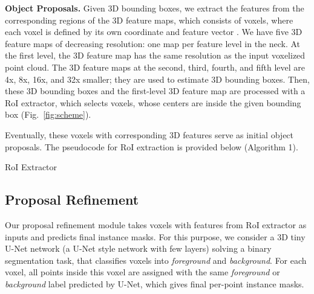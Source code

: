 \documentclass[10pt,twocolumn,letterpaper]{article}
\newcommand\inline{\noindent\textbf}
\begin{document}
\inline{Object Proposals.}
Given 3D bounding boxes, we extract the features from the corresponding regions of the 3D feature maps, which consists of voxels, where each voxel is defined by its own coordinate  and feature vector . We have five 3D feature maps of decreasing resolution: one map per feature level in the neck. At the first level, the 3D feature map has the same resolution as the input voxelized point cloud. The 3D feature maps at the second, third, fourth, and fifth level are 4x, 8x, 16x, and 32x smaller; they are used to estimate 3D bounding boxes. Then, these 3D bounding boxes and the first-level 3D feature map are processed with a RoI extractor, which selects voxels, whose centers are inside the given bounding box (Fig.~\ref{fig:scheme}). 

Eventually, these voxels with corresponding 3D features serve as initial object proposals. The pseudocode for RoI extraction is provided below (Algorithm 1).


\begin{algorithm}[!ht]
\DontPrintSemicolon
\LinesNumberedHidden
  

    {
        
    }
    {
         {
            
		
		
		
		
		
  
            \If{} {
                
            }
        }
    }

     {
      
        \If{}
            {
                
            }
      }
\label{algo:roi-extractor}
\caption{RoI Extractor}
\end{algorithm}

\subsection{Proposal Refinement}
\label{ssec:proposal-refinement}

Our proposal refinement module takes voxels with features from RoI extractor as inputs and predicts final instance masks. For this purpose, we consider a 3D tiny U-Net network (a U-Net style network with few layers) solving a binary segmentation task, that classifies voxels into \textit{foreground} and \textit{background}. For each voxel, all points inside this voxel are assigned with the same \textit{foreground} or \textit{background} label predicted by U-Net, which gives final per-point instance masks.
\end{document}
